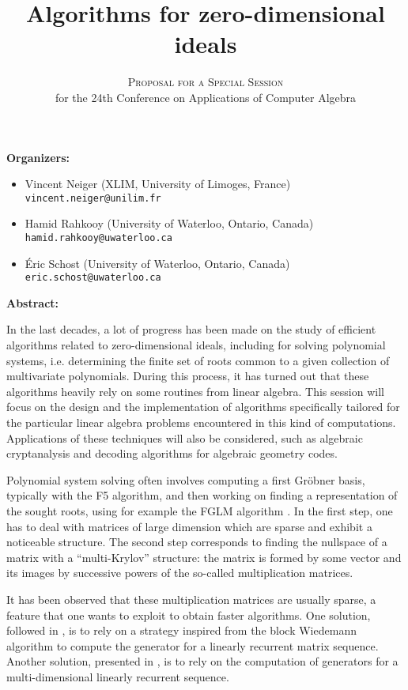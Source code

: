 \documentclass[12pt,english]{article}
\title{Algorithms for zero-dimensional ideals}
\author{\textsc{Proposal for a Special Session} \\
  for the 24th Conference on Applications of Computer Algebra}
\date{}
\begin{document}
\maketitle

\textbf{Organizers:}
\begin{itemize}
  \item Vincent Neiger (XLIM, University of Limoges, France) \\
    {\small \verb+vincent.neiger@unilim.fr+}
  \item Hamid Rahkooy (University of Waterloo, Ontario, Canada) \\
    {\small \verb+hamid.rahkooy@uwaterloo.ca+}
  \item \'Eric Schost (University of Waterloo, Ontario, Canada) \\
    {\small \texttt{eric.schost@uwaterloo.ca}}
\end{itemize}

\textbf{Abstract:}

In the last decades, a lot of progress has been made on the study of efficient
algorithms related to zero-dimensional ideals, including for solving polynomial
systems, i.e. determining the finite set of roots common to a given collection
of multivariate polynomials.  During this process, it has turned out that these
algorithms heavily rely on some routines from linear algebra.  This session
will focus on the design and the implementation of algorithms specifically
tailored for the particular linear algebra problems encountered in this kind of
computations.  Applications of these techniques will also be considered, such
as algebraic cryptanalysis and decoding algorithms for algebraic geometry
codes.

Polynomial system solving often involves computing a first Gr\"obner basis,
typically with the F5 algorithm, and then working on finding a representation
of the sought roots, using for example the FGLM algorithm \cite{FaGiLaMo93}.
In the first step, one has to deal with matrices of large dimension which are
sparse and exhibit a noticeable structure.  The second step corresponds to
finding the nullspace of a matrix with a ``multi-Krylov'' structure: the matrix
is formed by some vector and its images by successive powers of the so-called
multiplication matrices.

It has been observed that these multiplication matrices are usually sparse, a
feature that one wants to exploit to obtain faster algorithms.  One solution,
followed in \cite{Steel15}, is to rely on a strategy inspired from the block
Wiedemann algorithm \cite{Coppersmith94,Villard97a} to compute the generator
for a linearly recurrent matrix sequence.  Another solution, presented in
\cite{FaMo17}, is to rely on the computation of generators for a
multi-dimensional linearly recurrent sequence.
\end{document}
